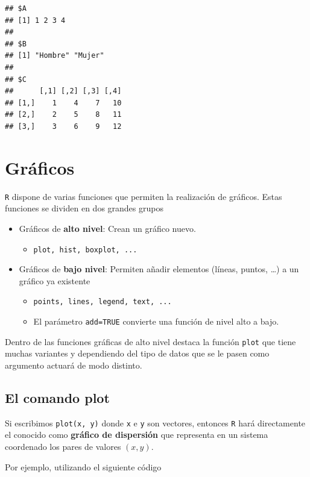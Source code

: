 \documentclass[]{book}
\providecommand{\tightlist}{%
  \setlength{\itemsep}{0pt}\setlength{\parskip}{0pt}}
\begin{document}
\begin{verbatim}
## $A
## [1] 1 2 3 4
## 
## $B
## [1] "Hombre" "Mujer" 
## 
## $C
##      [,1] [,2] [,3] [,4]
## [1,]    1    4    7   10
## [2,]    2    5    8   11
## [3,]    3    6    9   12
\end{verbatim}

\chapter{Gráficos}\label{graficos}

\texttt{R} dispone de varias funciones que permiten la realización de
gráficos. Estas funciones se dividen en dos grandes grupos

\begin{itemize}
\item
  Gráficos de \textbf{alto nivel}: Crean un gráfico nuevo.

  \begin{itemize}
  \tightlist
  \item
    \texttt{plot,\ hist,\ boxplot,\ ...}
  \end{itemize}
\item
  Gráficos de \textbf{bajo nivel}: Permiten añadir elementos (líneas,
  puntos, \ldots{}) a un gráfico ya existente

  \begin{itemize}
  \item
    \texttt{points,\ lines,\ legend,\ text,\ ...}
  \item
    El parámetro \texttt{add=TRUE} convierte una función de nivel alto a
    bajo.
  \end{itemize}
\end{itemize}

Dentro de las funciones gráficas de alto nivel destaca la función
\texttt{plot} que tiene muchas variantes y dependiendo del tipo de datos
que se le pasen como argumento actuará de modo distinto.

\section{El comando plot}\label{el-comando-plot}

Si escribimos \texttt{plot(x,\ y)} donde \texttt{x} e \texttt{y} son
vectores, entonces \texttt{R} hará directamente el conocido como
\textbf{gráfico de dispersión} que representa en un sistema coordenado
los pares de valores \((x,y)\).

Por ejemplo, utilizando el siguiente código
\end{document}
